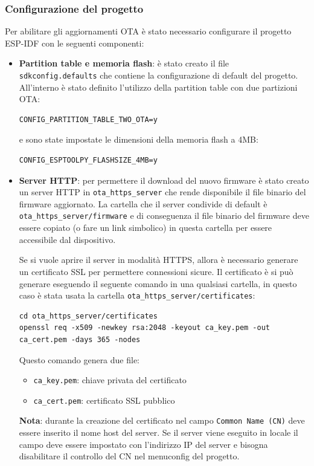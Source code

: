 \documentclass[a4paper]{article}
\begin{document}
\subsubsection{Configurazione del progetto}
Per abilitare gli aggiornamenti OTA è stato necessario configurare il progetto ESP-IDF
con le seguenti componenti:
\begin{itemize}
  \item \textbf{Partition table e memoria flash}: è stato creato il file\\
    \texttt{sdkconfig.defaults}
    che contiene la configurazione di default del progetto. All'interno è stato
    definito l'utilizzo della partition table con due partizioni OTA:
\begin{lstlisting}
CONFIG_PARTITION_TABLE_TWO_OTA=y
\end{lstlisting}
    e sono state impostate le dimensioni della memoria flash a 4MB:
\begin{lstlisting}
CONFIG_ESPTOOLPY_FLASHSIZE_4MB=y
\end{lstlisting}

  \item \textbf{Server HTTP}: per permettere il download del nuovo firmware è stato
    creato un server HTTP in \texttt{ota\_https\_server} che rende
    disponibile il file binario del firmware aggiornato. La cartella che il server
    condivide di default è \texttt{ota\_https\_server/firmware} e di conseguenza
    il file binario del firmware deve essere copiato (o fare un link simbolico) in
    questa cartella per essere accessibile dal dispositivo.

    Se si vuole aprire il server in modalità HTTPS, allora è necessario generare un
    certificato SSL per permettere connessioni sicure. 
    Il certificato è si può generare eseguendo il seguente comando in una qualsiasi
    cartella, in questo caso è stata usata la cartella
    \texttt{ota\_https\_server/certificates}:
\begin{lstlisting}
cd ota_https_server/certificates
openssl req -x509 -newkey rsa:2048 -keyout ca_key.pem -out ca_cert.pem -days 365 -nodes
\end{lstlisting}
    Questo comando genera due file:
    \begin{itemize}
      \item \texttt{ca\_key.pem}: chiave privata del certificato
      \item \texttt{ca\_cert.pem}: certificato SSL pubblico
    \end{itemize}
    \textbf{Nota}: durante la creazione del certificato nel campo \texttt{Common Name (CN)}
    deve essere inserito il nome host del server. Se il server viene eseguito in locale
    il campo deve essere impostato con l'indirizzo IP del server e bisogna disabilitare
    il controllo del CN nel menuconfig del progetto.


\end{itemize}
\end{document}

